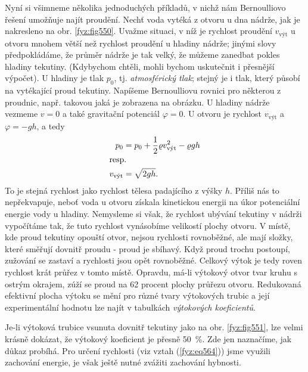     Nyní si všimneme několika jednoduchých příkladů, v nichž nám Bernoulliovo řešení umožňuje najít 
    proudění. Nechť voda vytéká z otvoru u dna nádrže, jak je nakresleno na obr. \ref{fyz:fig550}. 
    Uvažme situaci, v níž je rychlost proudění \(v_{\text{výt}}\) u otvoru mnohem větší než 
    rychlost proudění u hladiny nádrže; jinými slovy předpokládáme, že průměr nádrže je tak velký, 
    že můžeme zanedbat pokles hladiny tekutiny. (Kdybychom chtěli, mohli bychom uskutečnit i 
    přesnější výpočet). U hladiny je tlak \(p_0\), tj. \emph{atmosférický tlak}; stejný je i tlak, 
    který působí na vytékající proud tekutiny. Napíšeme Bernoulliovu rovnici pro některou z 
    proudnic, např. takovou jaká je zobrazena na obrázku. U hladiny nádrže vezmeme \(v = 0\) a také 
    gravitační potenciál \(\varphi = 0\). U otvoru je rychlost \(v_{\text{výt}}\) a \(\varphi= 
    -gh\), a tedy
    \begin{align}
      p_0 &= p_0 + \dfrac{1}{2}\varrho v_{\text{výt}}^2 - \varrho gh \nonumber \\
      \shortintertext{resp.}
      v_{\text{výt}} &= \sqrt{2gh}.                                   \label{fyz:eq564}
    \end{align}
    To je stejná rychlost jako rychlost tělesa padajícího z výšky \(h\). Příliš nás to 
    nepřekvapuje, neboť voda u otvoru získala kinetickou energii na úkor potenciální energie vody u 
    hladiny. Nemysleme si však, že rychlost ubývání tekutiny v nádrži vypočítáme tak, že tuto 
    rychlost vynásobíme velikostí plochy otvoru. V místě, kde proud tekutiny opouští otvor, nejsou 
    rychlosti rovnoběžné, ale mají složky, které směřují dovnitř proudu - proud je sbíhavý. Když 
    proud trochu postoupí, zužování se zastaví a rychlosti jsou opět rovnoběžné. Celkový výtok je 
    tedy roven rychlost krát průřez v tomto místě. Opravdu, má-li výtokový otvor tvar kruhu s 
    ostrým okrajem, zúží se proud na \num{62} procent plochy průřezu otvoru. Redukovaná efektivní 
    plocha výtoku se mění pro různé tvary výtokových trubic a její experimentální hodnotu lze najít 
    v tabulkách \emph{výtokových koeficientů}.
    
    Je-li výtoková trubice vsunuta dovnitř tekutiny jako na obr. \ref{fyz:fig551}, lze velmi krásně 
    dokázat, že výtokový koeficient je přesně \SI{50}{\percent}. Zde jen naznačíme, jak důkaz 
    probíhá. Pro určení rychlosti (viz vztah (\ref{fyz:eq564})) jsme využili zachování energie, je 
    však ještě nutné zvážiti zachování hybnosti.
    
